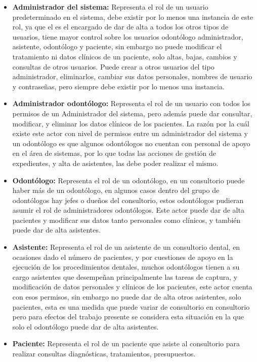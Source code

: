 \begin{itemize}
\item \textbf{Administrador del sistema:} Representa el rol de un usuario predeterminado en el sistema, debe existir por lo menos una instancia de este rol, ya que el es el encargado de dar de alta a todos los otros tipos de usuarios, tiene mayor control sobre los usuarios odontólogo administrador, asistente, odontólogo y paciente, sin embargo no puede modificar el tratamiento ni datos clínicos de un paciente, solo altas, bajas, cambios y consultas de otros usuarios. Puede crear a otros usuarios del tipo administrador, eliminarlos, cambiar sus datos personales, nombres de usuario y contraseñas, pero siempre debe existir por lo menos una instancia.
                
\item \textbf{Administrador odontólogo:} Representa el rol de un usuario con todos los permisos de un Administrador del sistema, pero además puede dar consultar, modificar, y eliminar los datos clínicos de los pacientes. La razón por la cuál existe este actor con nivel de permisos entre un administrador del sistema y un odontólogo es que algunos odontólogos no cuentan con personal de apoyo en el área de sistemas, por lo que todas las acciones de gestión de expedientes, y alta de asistentes, las debe poder realizar el mismo.
                 
\item \textbf{Odontólogo:} Representa el rol de un odontólogo, en un consultorio puede haber más de un odontólogo, en algunos casos dentro del grupo de odontólogos hay jefes o dueños del consultorio, estos odontólogos pudieran asumir el rol de administradores odontólogos. Este actor puede dar de alta pacientes y modificar sus datos tanto personales como clínicos, y también puede dar de alta asistentes.
                 
\item \textbf{Asistente:} Representa el rol de un asistente de un consultorio dental, en ocasiones dado el número de pacientes, y por cuestiones de apoyo en la ejecución de los procedimientos dentales, muchos odontólogos tienen a su cargo asistentes que desempeñan principalmente las tareas de captura, y modificación de datos personales y clínicos de los pacientes, este actor cuenta con esos permisos, sin embargo no puede dar de alta otros asistentes, solo pacientes, esta es una medida que puede variar de consultorio en consultorio pero para efectos del trabajo presente se considera esta situación en la que solo el odontólogo puede dar de alta asistentes.

\item \textbf{Paciente:} Representa el rol de un paciente que asiste al consultorio para realizar consultas diagnósticas, tratamientos, presupuestos.
\end{itemize}

